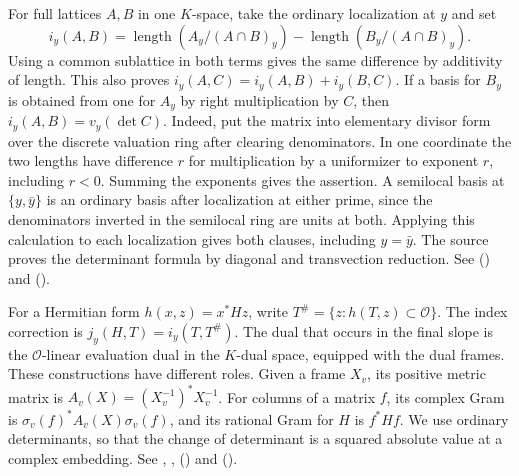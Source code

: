 For full lattices $A,B$ in one $K$-space, take the ordinary localization
at $y$ and set
\[
 i_y(A,B)=\operatorname{length}(A_y/(A\cap B)_y)
                    -\operatorname{length}(B_y/(A\cap B)_y).
\]
Using a common sublattice in both terms gives the same difference by
additivity of length. This also proves $i_y(A,C)=i_y(A,B)+i_y(B,C)$.
If a basis for $B_y$ is obtained from one for $A_y$ by right multiplication
by $C$, then $i_y(A,B)=v_y(\det C)$. Indeed, put the matrix into elementary
divisor form over the discrete valuation ring after clearing denominators.
In one coordinate the two lengths have difference $r$ for multiplication by
a uniformizer to exponent $r$, including $r<0$. Summing the exponents gives
the assertion. A semilocal basis at $\{y,\bar y\}$ is an ordinary basis
after localization at either prime, since the denominators inverted in
the semilocal ring are units at both. Applying this calculation to each
localization gives both clauses, including $y=\bar y$. The source proves
the determinant formula by diagonal and transvection reduction. See 
() and
 ().

For a Hermitian form $h(x,z)=x^*Hz$, write
$T^\#=\{z:h(T,z)\subset\mathcal O\}$. The index correction is
$j_y(H,T)=i_y(T,T^\#)$. The dual that occurs in the final slope is the
$\mathcal O$-linear evaluation dual in the $K$-dual space, equipped with
the dual frames. These constructions have different roles. Given a frame
$X_v$, its positive metric matrix is $A_v(X)=(X_v^{-1})^*X_v^{-1}$.
For columns of a matrix $f$, its complex Gram is
$\sigma_v(f)^* A_v(X)\sigma_v(f)$, and its rational Gram for $H$ is $f^*Hf$.
We use ordinary determinants, so that the change of determinant is a squared
absolute value at a complex embedding.
See , , 
() and
 ().

